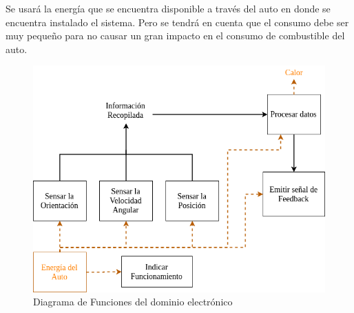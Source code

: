 Se usará la energía que se encuentra disponible a través del auto en donde se encuentra instalado el sistema. Pero se tendrá en cuenta que el consumo debe ser muy pequeño para no causar un gran impacto en el consumo de combustible del auto.


\begin{figure}[htbp!]
\centering
\includegraphics[width=\textwidth]{Fig2}
\caption{Diagrama de Funciones del dominio electrónico}
\label{fig:3.2}
\end{figure}
